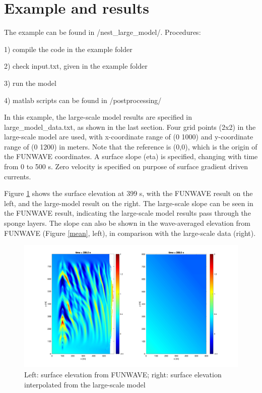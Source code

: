 \documentclass[preprint,10pt]{elsarticle}
\begin{document}
   
\section{Example and results}

The example can be found in /nest\_large\_model/. Procedures:

1) compile the code in the example folder

2) check input.txt, given in the example folder

3) run the model

4) matlab scripts can be found in /postprocessing/

\vspace{0.5cm}
\noindent
In this example,  the large-scale model results are specified in large\_model\_data.txt, as shown in the last section. Four grid points (2x2) in the large-scale model  are used, with x-coordinate range of (0 1000) and y-coordinate range of (0 1200) in meters. Note that the reference is (0,0), which is the origin of the FUNWAVE coordinates. A surface slope (eta) is specified, changing with time from 0 to 500 s. Zero velocity is specified on purpose of surface gradient driven currents. 

Figure \ref{surface} shows the surface elevation at 399 s, with the FUNWAVE result on the left, and the large-model result on the right. The large-scale slope can be seen in the FUNWAVE result, indicating the large-scale model results pass through the sponge layers. The slope can also be shown in the wave-averaged elevation from FUNWAVE (Figure \ref{mean}, left), in comparison with the large-scale data (right). 

 \begin{figure}
\begin{center}
 \includegraphics[width=1.0\textwidth]{figures/elevation_view.jpg}
 \caption{Left: surface elevation from FUNWAVE; right: surface elevation interpolated from the large-scale model }
 \label{surface}
 \end{center}
 \end{figure}  
  
\end{document}
